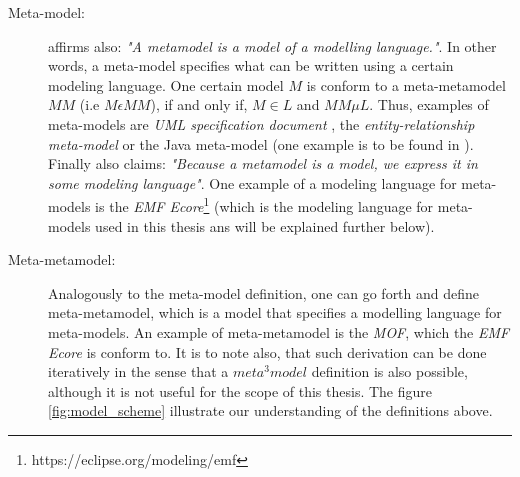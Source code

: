 \documentclass[tuberlin,cic,tc,english,noabntcite]{iiufrgs}
\begin{document}
\begin{description}
	\item[Meta-model:] \citet[p. 14]{favre2004foundations2} affirms also: \emph{"A metamodel is a model of a modelling language."}. In other words, a meta-model specifies what can be written using a certain modeling language. One certain model $M$ is conform to a meta-metamodel $MM$ (i.e $M \epsilon MM$), if and only if, $M \in L$ and $MM \mu L$. Thus, examples of meta-models are \emph{UML specification document} \citep{omg2007unified}, the \emph{entity-relationship meta-model} \citep{chen1976entity} or the Java meta-model (one example is to be found in \citet{heidenreich2009jamopp}). Finally \citet[p. 29]{seidewitz2003models} also claims: \emph{"Because a metamodel is a model, we express it in some modeling language"}. One example of a modeling language for meta-models is the \emph{EMF Ecore}\footnote{https://eclipse.org/modeling/emf} (which is the modeling language for meta-models used in this thesis ans will be explained further below).

	\item[Meta-metamodel:] Analogously to the meta-model definition, one can go forth and define meta-metamodel, which is a model that specifies a modelling language for meta-models. An example of meta-metamodel is the \emph{MOF}\citep{omg2015meta}, which the \emph{EMF Ecore} is conform to. It is to note also, that such derivation can be done iteratively in the sense that a $meta^3model$ definition is also possible, although it is not useful for the scope of this thesis. The figure \ref{fig:model_scheme} illustrate our understanding of the definitions above.


\end{description}
\end{document}
